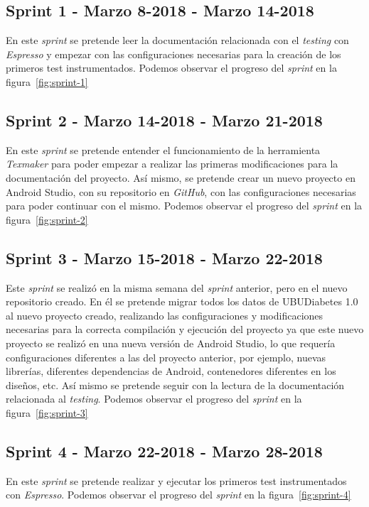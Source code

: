 \subsection{Sprint 1 - Marzo 8-2018 - Marzo 14-2018}
En este \textit{sprint} se pretende leer la documentación relacionada con el \textit{testing} con \textit{Espresso} y empezar con las configuraciones necesarias para la creación de los primeros test instrumentados.
Podemos observar el progreso del \textit{sprint} en la figura~\ref{fig:sprint-1}
\subsection{Sprint 2 - Marzo 14-2018 - Marzo 21-2018}
En este \textit{sprint} se pretende entender el funcionamiento de la herramienta \textit{Texmaker} para poder empezar a realizar las primeras modificaciones para la documentación del proyecto.
Así mismo, se pretende crear un nuevo proyecto en Android Studio, con su repositorio en \textit{GitHub}, con las configuraciones necesarias para poder continuar con el mismo.
Podemos observar el progreso del \textit{sprint} en la figura~\ref{fig:sprint-2}
\subsection{Sprint 3 - Marzo 15-2018 - Marzo 22-2018}
Este \textit{sprint} se realizó en la misma semana del \textit{sprint} anterior, pero en el nuevo repositorio creado. En él se pretende migrar todos los datos de UBUDiabetes 1.0 al nuevo proyecto creado, realizando las configuraciones y modificaciones necesarias para la correcta compilación y ejecución del proyecto ya que este nuevo proyecto se realizó en una nueva versión de Android Studio, lo que requería configuraciones diferentes a las del proyecto anterior, por ejemplo, nuevas librerías, diferentes dependencias de Android, contenedores diferentes en los diseños, etc. Así mismo se pretende seguir con la lectura de la documentación relacionada al \textit{testing}.
Podemos observar el progreso del \textit{sprint} en la figura~\ref{fig:sprint-3}
\subsection{Sprint 4 - Marzo 22-2018 - Marzo 28-2018}
En este \textit{sprint} se pretende realizar y ejecutar los primeros test instrumentados con \textit{Espresso}.
Podemos observar el progreso del \textit{sprint} en la figura~\ref{fig:sprint-4}
